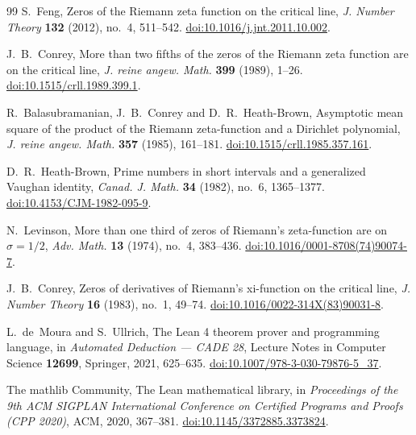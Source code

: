 \documentclass[11pt]{article}
\theoremstyle{definition}
\begin{document}
\begin{thebibliography}{99}
S.~Feng, Zeros of the Riemann zeta function on the critical line,
\emph{J. Number Theory} \textbf{132} (2012), no.~4, 511--542.
\href{https://doi.org/10.1016/j.jnt.2011.10.002}{doi:10.1016/j.jnt.2011.10.002}.

J.~B.~Conrey, More than two fifths of the zeros of the Riemann zeta
function are on the critical line,
\emph{J. reine angew. Math.} \textbf{399} (1989), 1--26.
\href{https://doi.org/10.1515/crll.1989.399.1}{doi:10.1515/crll.1989.399.1}.

R.~Balasubramanian, J.~B.~Conrey and D.~R.~Heath-Brown,
Asymptotic mean square of the product of the Riemann zeta-function
and a Dirichlet polynomial,
\emph{J. reine angew. Math.} \textbf{357} (1985), 161--181.
\href{https://doi.org/10.1515/crll.1985.357.161}{doi:10.1515/crll.1985.357.161}.

D.~R.~Heath-Brown, Prime numbers in short intervals and a generalized
Vaughan identity, \emph{Canad. J. Math.} \textbf{34} (1982), no.~6, 1365--1377.
\href{https://doi.org/10.4153/CJM-1982-095-9}{doi:10.4153/CJM-1982-095-9}.

N.~Levinson, More than one third of zeros of Riemann's zeta-function
are on $\sigma=1/2$,
\emph{Adv. Math.} \textbf{13} (1974), no.~4, 383--436.
\href{https://doi.org/10.1016/0001-8708(74)90074-7}{doi:10.1016/0001-8708(74)90074-7}.

J.~B.~Conrey, Zeros of derivatives of Riemann's xi-function on the critical line,
\emph{J. Number Theory} \textbf{16} (1983), no.~1, 49--74.
\href{https://doi.org/10.1016/0022-314X(83)90031-8}{doi:10.1016/0022-314X(83)90031-8}.

L.~de~Moura and S.~Ullrich, The Lean 4 theorem prover and programming language,
in \emph{Automated Deduction --- CADE 28}, Lecture Notes in Computer Science
\textbf{12699}, Springer, 2021, 625--635.
\href{https://doi.org/10.1007/978-3-030-79876-5_37}{doi:10.1007/978-3-030-79876-5\_37}.

The mathlib Community, The Lean mathematical library,
in \emph{Proceedings of the 9th ACM SIGPLAN International Conference
on Certified Programs and Proofs (CPP 2020)}, ACM, 2020, 367--381.
\href{https://doi.org/10.1145/3372885.3373824}{doi:10.1145/3372885.3373824}.
\end{thebibliography}
\end{document}
